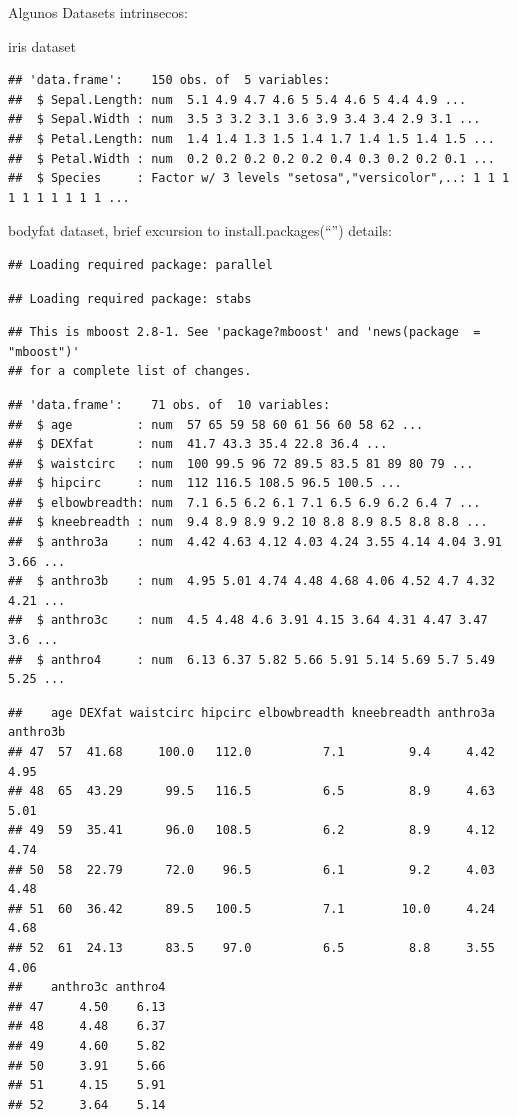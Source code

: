 \documentclass[ignorenonframetext,]{beamer}
\begin{document}
\begin{frame}[fragile]{Algunos Datasets intrinsecos:}

iris dataset

\begin{verbatim}
## 'data.frame':    150 obs. of  5 variables:
##  $ Sepal.Length: num  5.1 4.9 4.7 4.6 5 5.4 4.6 5 4.4 4.9 ...
##  $ Sepal.Width : num  3.5 3 3.2 3.1 3.6 3.9 3.4 3.4 2.9 3.1 ...
##  $ Petal.Length: num  1.4 1.4 1.3 1.5 1.4 1.7 1.4 1.5 1.4 1.5 ...
##  $ Petal.Width : num  0.2 0.2 0.2 0.2 0.2 0.4 0.3 0.2 0.2 0.1 ...
##  $ Species     : Factor w/ 3 levels "setosa","versicolor",..: 1 1 1 1 1 1 1 1 1 1 ...
\end{verbatim}

bodyfat dataset, brief excursion to install.packages(``'') details:

\begin{verbatim}
## Loading required package: parallel
\end{verbatim}

\begin{verbatim}
## Loading required package: stabs
\end{verbatim}

\begin{verbatim}
## This is mboost 2.8-1. See 'package?mboost' and 'news(package  = "mboost")'
## for a complete list of changes.
\end{verbatim}

\begin{verbatim}
## 'data.frame':    71 obs. of  10 variables:
##  $ age         : num  57 65 59 58 60 61 56 60 58 62 ...
##  $ DEXfat      : num  41.7 43.3 35.4 22.8 36.4 ...
##  $ waistcirc   : num  100 99.5 96 72 89.5 83.5 81 89 80 79 ...
##  $ hipcirc     : num  112 116.5 108.5 96.5 100.5 ...
##  $ elbowbreadth: num  7.1 6.5 6.2 6.1 7.1 6.5 6.9 6.2 6.4 7 ...
##  $ kneebreadth : num  9.4 8.9 8.9 9.2 10 8.8 8.9 8.5 8.8 8.8 ...
##  $ anthro3a    : num  4.42 4.63 4.12 4.03 4.24 3.55 4.14 4.04 3.91 3.66 ...
##  $ anthro3b    : num  4.95 5.01 4.74 4.48 4.68 4.06 4.52 4.7 4.32 4.21 ...
##  $ anthro3c    : num  4.5 4.48 4.6 3.91 4.15 3.64 4.31 4.47 3.47 3.6 ...
##  $ anthro4     : num  6.13 6.37 5.82 5.66 5.91 5.14 5.69 5.7 5.49 5.25 ...
\end{verbatim}

\begin{verbatim}
##    age DEXfat waistcirc hipcirc elbowbreadth kneebreadth anthro3a anthro3b
## 47  57  41.68     100.0   112.0          7.1         9.4     4.42     4.95
## 48  65  43.29      99.5   116.5          6.5         8.9     4.63     5.01
## 49  59  35.41      96.0   108.5          6.2         8.9     4.12     4.74
## 50  58  22.79      72.0    96.5          6.1         9.2     4.03     4.48
## 51  60  36.42      89.5   100.5          7.1        10.0     4.24     4.68
## 52  61  24.13      83.5    97.0          6.5         8.8     3.55     4.06
##    anthro3c anthro4
## 47     4.50    6.13
## 48     4.48    6.37
## 49     4.60    5.82
## 50     3.91    5.66
## 51     4.15    5.91
## 52     3.64    5.14
\end{verbatim}

\end{frame}
\end{document}
